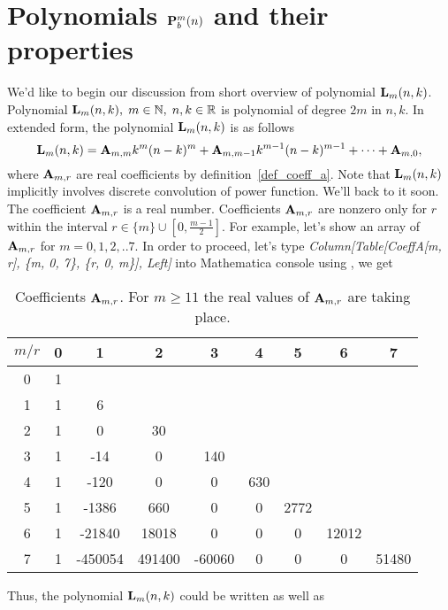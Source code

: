 \documentclass[12pt,letterpaper,oneside,reqno]{amsart}
\newcommand \coeffA [3][A] {{\mathbf{#1}} \sb{#2,#3}}
\newcommand \polynomialP [4][P]{{\mathbf{#1}}\sp{#2} \sb{#3}(#4)}
\newcommand \polynomialL [4][L]{{\mathbf{#1}}\sb{#2}(#3,#4)}
\numberwithin{equation}{section}
\begin{document}
    \section{Polynomials \texorpdfstring{$\polynomialP{m}{b}{n}$}{P[m,b,n]} and their properties}
    We'd like to begin our discussion from short overview of polynomial $\polynomialL{m}{n}{k}$.
    Polynomial $\polynomialL{m}{n}{k}, \; m\in\mathbb{N}, \; n,k \in \mathbb{R}$ is polynomial of degree $2m$ in $n,k$.
    In extended form, the polynomial $\polynomialL{m}{n}{k}$ is as follows
    \begin{equation*}
        \polynomialL{m}{n}{k} = \coeffA{m}{m} k^m(n-k)^m + \coeffA{m}{m-1} k^{m-1}(n-k)^{m-1}+\cdots+\coeffA{m}{0},
    \end{equation*}
    where $\coeffA{m}{r}$ are real coefficients by definition~\ref{def_coeff_a}.
    Note that $\polynomialL{m}{n}{k}$ implicitly involves discrete convolution of power function.
    We'll back to it soon.
    The coefficient $\coeffA{m}{r}$ is a real number.
    Coefficients $\coeffA{m}{r}$ are nonzero only for $r$ within the interval $r \in \{m\} \cup \left[0,\frac{m-1}{2}\right]$.
    For example, let's show an array of $\coeffA{m}{r}$ for $m=0,1,2,.. 7$.
    In order to proceed, let's type \textit{Column[Table[CoeffA[m, r], \{m, 0, 7\}, \{r, 0, m\}], Left]}
    into Mathematica console using \cite{mmca_package}, we get
    \begin{table}[H]
        \begin{tabular}{c|cccccccc}
            $m/r$ &0 &1 &2 &3 &4 &5 &6 &7 \\ [3px]
            \hline
            0 &1 & & & & & & & \\
            1 &1 &6 & & & & & & \\
            2 &1 &0 &30 & & & & & \\
            3 &1 &-14 &0 &140 & & & & \\
            4 &1 &-120 &0 &0 &630 & & & \\
            5 &1 &-1386 &660 &0 &0 &2772 & & \\
            6 &1 &-21840 &18018 &0 &0 &0 &12012 & \\
            7 &1 &-450054 &491400 &-60060 &0 &0 &0 &51480
        \end{tabular}
        \caption{Coefficients $\coeffA{m}{r}$.
        For $m \geq 11$ the real values of $\coeffA{m}{r}$ are taking place.}
    \end{table}
    Thus, the polynomial $\polynomialL{m}{n}{k}$ could be written as well as
\end{document}
